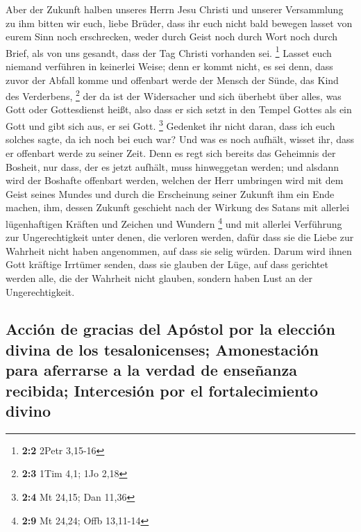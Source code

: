  Aber der Zukunft halben unseres Herrn Jesu Christi und
unserer Versammlung zu ihm bitten wir euch, liebe Brüder, 
dass ihr euch nicht bald bewegen lasset von eurem Sinn noch erschrecken,
weder durch Geist noch durch Wort noch durch Brief, als von uns gesandt,
dass der Tag Christi vorhanden sei. \footnote{\textbf{2:2} 2Petr 3,15-16}
 Lasset euch niemand verführen in keinerlei Weise; denn er
kommt nicht, es sei denn, dass zuvor der Abfall komme und offenbart
werde der Mensch der Sünde, das Kind des Verderbens, \footnote{\textbf{2:3}
  1Tim 4,1; 1Jo 2,18}  der da ist der Widersacher und sich
überhebt über alles, was Gott oder Gottesdienst heißt, also dass er sich
setzt in den Tempel Gottes als ein Gott und gibt sich aus, er sei Gott.
\footnote{\textbf{2:4} Mt 24,15; Dan 11,36}  Gedenket ihr
nicht daran, dass ich euch solches sagte, da ich noch bei euch war?
 Und was es noch aufhält, wisset ihr, dass er offenbart
werde zu seiner Zeit.  Denn es regt sich bereits das
Geheimnis der Bosheit, nur dass, der es jetzt aufhält, muss hinweggetan
werden;  und alsdann wird der Boshafte offenbart werden,
welchen der Herr umbringen wird mit dem Geist seines Mundes und durch
die Erscheinung seiner Zukunft ihm ein Ende machen,  ihm,
dessen Zukunft geschieht nach der Wirkung des Satans mit allerlei
lügenhaftigen Kräften und Zeichen und Wundern \footnote{\textbf{2:9} Mt
  24,24; Offb 13,11-14}  und mit allerlei Verführung zur
Ungerechtigkeit unter denen, die verloren werden, dafür dass sie die
Liebe zur Wahrheit nicht haben angenommen, auf dass sie selig würden.
 Darum wird ihnen Gott kräftige Irrtümer senden, dass sie
glauben der Lüge,  auf dass gerichtet werden alle, die
der Wahrheit nicht glauben, sondern haben Lust an der Ungerechtigkeit.

\hypertarget{acciuxf3n-de-gracias-del-apuxf3stol-por-la-elecciuxf3n-divina-de-los-tesalonicenses-amonestaciuxf3n-para-aferrarse-a-la-verdad-de-enseuxf1anza-recibida-intercesiuxf3n-por-el-fortalecimiento-divino}{%
\subsection{Acción de gracias del Apóstol por la elección divina de los
tesalonicenses; Amonestación para aferrarse a la verdad de enseñanza
recibida; Intercesión por el fortalecimiento
divino}\label{acciuxf3n-de-gracias-del-apuxf3stol-por-la-elecciuxf3n-divina-de-los-tesalonicenses-amonestaciuxf3n-para-aferrarse-a-la-verdad-de-enseuxf1anza-recibida-intercesiuxf3n-por-el-fortalecimiento-divino}}

